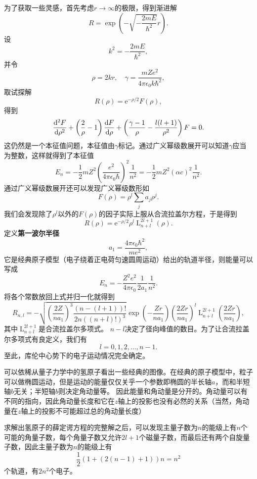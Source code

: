 \documentclass[UTF8, a4paper]{ctexart}
\newcommand*{\ee}{\mathrm{e}}
\DeclareMathOperator{\laguerre}{L}
\begin{document}
为了获取一些灵感，首先考虑$r\to \infty$的极限，得到渐进解
\[
    R = \exp(- \sqrt{- \frac{2 m E}{\hbar^2}} r).
\]
设
\[
    k^2 = - \frac{2 m E}{\hbar^2},
\]
并令
\[
    \rho = 2 k r, \quad \gamma = \frac{m Z e^2}{4\pi \epsilon_0 k \hbar^2}, 
\]
取试探解
\[
    R(\rho) = \ee^{- \rho / 2} F(\rho),
\]
得到
\[
    \dv[2]{F}{\rho} + \left( \frac{2}{\rho} - 1 \right) \dv{F}{\rho} + \left( \frac{\gamma - 1}{\rho} - \frac{l(l+1)}{\rho^2} \right) F = 0.
\]
这仍然是一个本征值问题，本征值由$\gamma$标记。通过广义幂级数展开可以知道$\gamma$应当为整数，这样就得到了本征值
\begin{equation}
    E_n = - \frac{1}{2} m Z^2 \left( \frac{e^2}{4\pi \epsilon_0 \hbar} \right)^2 \frac{1}{n^2} = - \frac{1}{2} m Z^2 (\alpha c)^2 \frac{1}{n^2}.
\end{equation}
通过广义幂级数展开还可以发现广义幂级数形如
\[
    F(\rho) = \rho^l \sum_j a_j \rho^j.
\]
我们会发现除了$\rho^l$以外的$F(\rho)$的因子实际上服从合流拉盖尔方程，于是得到
\[
    R(\rho) = \ee^{-\rho/2} \rho^l \laguerre_{n+l}^{2l+1}(\rho).
\]
定义\textbf{第一波尔半径}
\begin{equation}
    a_1 = \frac{4\pi \epsilon_0 \hbar^2}{m e^2},
\end{equation}
它是经典原子模型（电子绕着正电荷匀速圆周运动）给出的轨道半径，则能量可以写成
\begin{equation}
    E_n = - \frac{Z^2 e^2}{4 \pi \epsilon_0 } \frac{1}{2 a_1} \frac{1}{n^2}.
\end{equation}
将各个常数放回上式并归一化就得到
\begin{equation}
    R_{n, l} = - \sqrt{\left( \frac{2 Z}{n a_1} \right)^3 \frac{(n-(l+1))!}{2n ((n + l)!)^3}} \exp(- \frac{Z r}{n a_1}) \left( \frac{2 Z r}{n a_1} \right)^l \laguerre_{n+l}^{2l+1}\left(\frac{2 Z r}{n a_1}\right),
\end{equation}
其中$\laguerre_{n+l}^{2l+1}$是合流拉盖尔多项式。
$n-l$决定了径向峰值的数目。为了让合流拉盖尔多项式有良定义，我们有
\begin{equation}
    l = 0, 1, 2, \ldots, n-1.
\end{equation}
至此，库伦中心势下的电子运动情况完全确定。

可以依稀从量子力学中的氢原子看出一些经典的图像。在经典的原子模型中，粒子可以做椭圆运动，但是运动的能量仅仅关乎一个参数即椭圆的半长轴$a$，而和半短轴$b$无关；半短轴$b$则决定角动量等。
因此能量和角动量是分开的。角动量可以有不同的指向，因此角动量长度和它在$z$轴上的投影也没有必然的关系（当然，角动量在$z$轴上的投影不可能超过总的角动量长度）

求解出氢原子的薛定谔方程的完整解之后，可以发现主量子数为$n$的能级上有$n$个可能的角量子数，每个角量子数又允许$2l+1$个磁量子数，而最后还有两个自旋量子数，因此主量子数为$n$的能级上有
\[
    \frac{1}{2} (1 + (2(n-1)+1)) n = n^2
\]
个轨道，有$2n^2$个电子。
\end{document}
